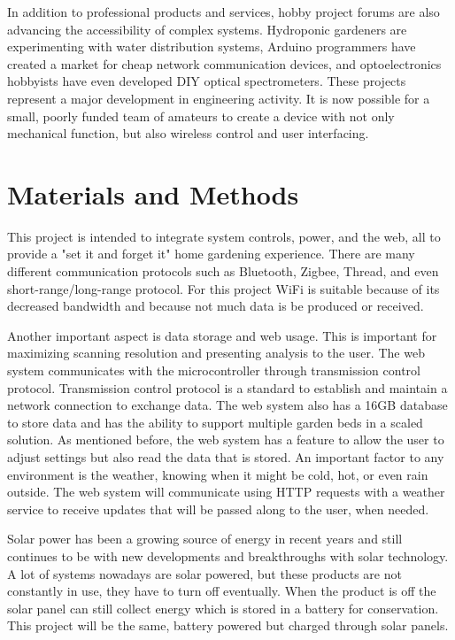 \documentclass[journal]{IEEEtran}
\begin{document}
In addition to professional products and services, hobby project forums are also advancing the
accessibility of complex systems. Hydroponic gardeners are experimenting with water distribution systems,
Arduino programmers have created a market for cheap network communication devices, and optoelectronics
hobbyists have even developed DIY optical spectrometers\cite{Cao}. These projects represent a major development in
engineering activity. It is now possible for a small, poorly funded team of amateurs to create a device
with not only mechanical function, but also wireless control and user interfacing. 

\section{Materials and Methods}

This project is intended to integrate system controls, power, and the web, all to provide 
a "set it and forget it" home gardening experience. There are many different communication protocols
such as Bluetooth, Zigbee, Thread, and even short-range/long-range protocol. For this project WiFi is suitable
because of its decreased bandwidth and because not much data is be produced or received.

Another important aspect is data storage and web usage. This is important for maximizing scanning resolution
and presenting analysis to the user. The web system communicates with the microcontroller through transmission control protocol.
Transmission control protocol is a standard to establish and maintain a network connection to 
exchange data. The web system also has a 16GB database to store data and has the ability to support 
multiple garden beds in a scaled solution. As mentioned before, the web system has a feature to 
allow the user to adjust settings but also read the data that is stored. An important factor to any 
environment is the weather, knowing when it might be cold, hot, or even rain outside. The web system 
will communicate using HTTP requests with a weather service to receive updates that will be passed along 
to the user, when needed.

Solar power has been a growing source of energy in recent years and still continues to be with new 
developments and breakthroughs with solar technology. A lot of systems nowadays are solar powered, but 
these products are not constantly in use, they have to turn off eventually. When the product is off the 
solar panel can still collect energy which is stored in a battery for conservation. This project will be 
the same, battery powered but charged through solar panels.
\end{document}
